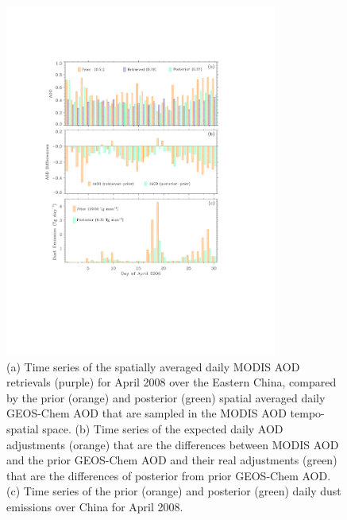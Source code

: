 \begin{figure}[p]
  \centering
  \includegraphics[width={0.8\textwidth}]{figures/a4.pdf}
  \caption{(a) Time series of the spatially averaged daily MODIS AOD
retrievals (purple) for April 2008 over the Eastern China, compared by
the prior (orange) and posterior (green) spatial averaged daily
GEOS-Chem AOD that are sampled in the MODIS AOD tempo-spatial space. (b)
Time series of the expected daily AOD adjustments (orange) that are the
differences between MODIS AOD and the prior GEOS-Chem AOD and their real
adjustments (green) that are the differences of posterior from prior
GEOS-Chem AOD. (c) Time series of the prior (orange) and posterior
(green) daily dust emissions over China for April 2008. \citep[Figure
adopted from][]{Xu13}}
  \label{fig:dailyaod}
 \end{figure}

